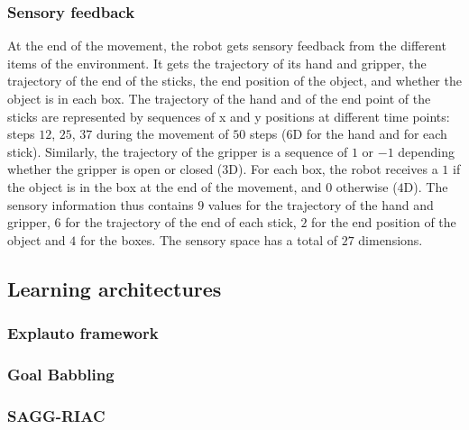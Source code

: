 \documentclass[10pt,letterpaper]{article}
\begin{document}
		
		\subsubsection{Sensory feedback}
		
			At the end of the movement, the robot gets sensory feedback from the different items of the environment.
			It gets the trajectory of its hand and gripper, the trajectory of the end of the sticks, 
			the end position of the object, and whether the object is in each box.		
			The trajectory of the hand and of the end point of the sticks are represented by sequences of x and y positions at different time points: 
			steps $12$, $25$, $37$ during the movement of $50$ steps ($6$D for the hand and for each stick).
			Similarly, the trajectory of the gripper is a sequence of $1$ or $-1$ depending whether the gripper is open or closed ($3$D).
			For each box, the robot receives a $1$ if the object is in the box at the end of the movement, and $0$ otherwise ($4$D).			 
			The sensory information thus contains $9$ values for the trajectory of the hand and gripper, $6$ for the trajectory of the end of each stick, $2$ for the end position of the object and $4$ for the boxes.
			The sensory space has a total of $27$ dimensions.
			
		
	
	\subsection{Learning architectures}

		\subsubsection{Explauto framework}
			
			\cite{moulin-frier_explauto:_2014}
			
				
		
		\subsubsection{Goal Babbling}
			
				
		
		\subsubsection{SAGG-RIAC}
			
			\cite{baranes_active_2013}
			
\end{document}

